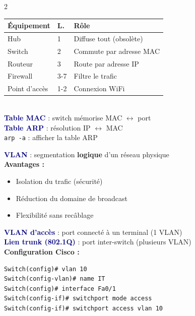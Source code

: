 \documentclass[a4paper,10pt]{article}
\newcommand{\key}[1]{\textbf{\textcolor{navy}{#1}}}
\begin{document}
\begin{multicols}{2}
\begin{tcolorbox}[basebox, colframe=teal, title=7. Équipements réseau]
{\footnotesize
\begin{tabularx}{\columnwidth}{@{}llX@{}}
\toprule
\textbf{Équipement} & \textbf{L.} & \textbf{Rôle} \\
\midrule
Hub           & 1   & Diffuse tout (obsolète) \\
Switch        & 2   & Commute par adresse MAC \\
Routeur       & 3   & Route par adresse IP \\
Firewall      & 3-7 & Filtre le trafic \\
Point d'accès & 1-2 & Connexion WiFi \\
\bottomrule
\end{tabularx}}
\vspace{4pt}\\
\key{Table MAC} : switch mémorise MAC $\leftrightarrow$ port \\
\key{Table ARP} : résolution IP $\leftrightarrow$ MAC \\
\texttt{arp -a} : afficher la table ARP
\end{tcolorbox}

\begin{tcolorbox}[basebox, colframe=orange, title=8. VLAN — Virtual LAN]
\key{VLAN} : segmentation \textbf{logique} d'un réseau physique \\[3pt]
\textbf{Avantages :}
\begin{itemize}
  \item Isolation du trafic (sécurité)
  \item Réduction du domaine de broadcast
  \item Flexibilité sans recâblage
\end{itemize}
\vspace{3pt}
\key{VLAN d'accès} : port connecté à un terminal (1 VLAN) \\
\key{Lien trunk (802.1Q)} : port inter-switch (plusieurs VLAN) \\[3pt]
\textbf{Configuration Cisco :}
\small
\begin{verbatim}
Switch(config)# vlan 10
Switch(config-vlan)# name IT
Switch(config)# interface Fa0/1
Switch(config-if)# switchport mode access
Switch(config-if)# switchport access vlan 10
\end{verbatim}
\normalsize
\end{tcolorbox}


\end{multicols}
\end{document}
